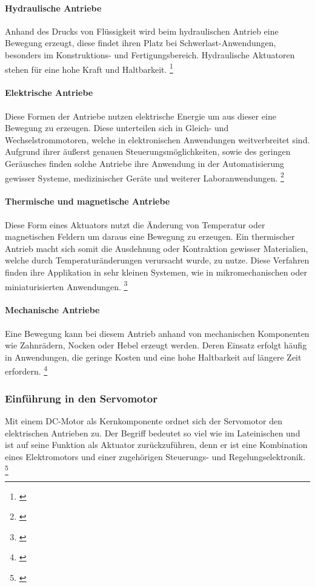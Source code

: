 \documentclass[titlepage,12pt,twoside]{article}
\begin{document}
\paragraph{Hydraulische Antriebe}
\hfill \break
\hfill \break
Anhand des Drucks von Flüssigkeit wird beim hydraulischen Antrieb eine 
Bewegung erzeugt, diese findet ihren Platz bei Schwerlast-Anwendungen, 
besonders im Konstruktions- und Fertigungsbereich. Hydraulische 
Aktuatoren stehen für eine hohe Kraft und Haltbarkeit. \footnote{\cite{Q1}} \\
\paragraph{Elektrische Antriebe}
\hfill \break
\hfill \break
Diese Formen der Antriebe nutzen elektrische Energie um aus dieser eine 
Bewegung zu erzeugen. Diese unterteilen sich in Gleich- und 
Wechselstrommotoren, welche in elektronischen Anwendungen weitverbreitet 
sind. Aufgrund ihrer äußerst genauen Steuerungsmöglichkeiten, sowie des 
geringen Geräusches finden solche Antriebe ihre Anwendung in der Automatisierung 
gewisser Systeme, medizinischer Geräte und weiterer Laboranwendungen. \footnote{\cite{Q1}} \\
\paragraph{Thermische und magnetische Antriebe}
\hfill \break
\hfill \break
Diese Form eines Aktuators nutzt die Änderung von Temperatur oder 
magnetischen Feldern um daraus eine Bewegung zu erzeugen. Ein thermischer 
Antrieb macht sich somit die Ausdehnung oder Kontraktion gewisser 
Materialien, welche durch Temperaturänderungen verursacht wurde, zu 
nutze. Diese Verfahren finden ihre Applikation in sehr kleinen Systemen, 
wie in mikromechanischen oder miniaturisierten Anwendungen. \footnote{\cite{Q1}} \\
\paragraph{Mechanische Antriebe}
\hfill \break
\hfill \break
Eine Bewegung kann bei diesem Antrieb anhand von mechanischen Komponenten 
wie Zahnrädern, Nocken oder Hebel erzeugt werden. Deren Einsatz erfolgt 
häufig in Anwendungen, die geringe Kosten und eine hohe Haltbarkeit auf 
längere Zeit erfordern. \footnote{\cite{Q1}} \\
\subsubsection{Einführung in den Servomotor}
Mit einem DC-Motor als Kernkomponente ordnet sich der Servomotor den 
elektrischen Antrieben zu. Der Begriff  bedeutet so viel wie 
 im Lateinischen und ist auf seine Funktion als 
Aktuator zurückzuführen, denn er ist eine Kombination eines 
Elektromotors und einer zugehörigen Steuerungs- und Regelungselektronik. \footnote{\cite{Q6}} \\
\end{document}
